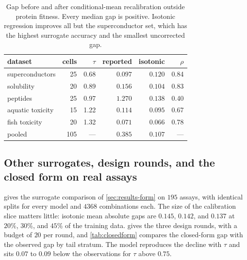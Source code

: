 \documentclass{article}
\theoremstyle{plain}
\theoremstyle{definition}
\begin{document}
\begin{table}[ht]
\caption{Gap before and after conditional-mean recalibration outside protein fitness.
Every median gap is positive. Isotonic regression improves all but the superconductor
set, which has the highest surrogate accuracy and the smallest uncorrected gap.}
\label{tab:domains}
\vskip 0.1in
\begin{center}
\begin{small}
\begin{tabular}{lrrrrr}
\toprule
dataset & cells & $\tau$ & reported & isotonic & $\rho$ \\
\midrule
superconductors & 25 & 0.68 & $0.097$ & $0.120$ & 0.84 \\
solubility      & 20 & 0.89 & $0.156$ & $0.104$ & 0.83 \\
peptides        & 25 & 0.97 & $1.270$ & $0.138$ & 0.40 \\
aquatic toxicity & 15 & 1.22 & $0.114$ & $0.095$ & 0.67 \\
fish toxicity   & 20 & 1.32 & $0.071$ & $0.066$ & 0.78 \\
\midrule
pooled          & 105 & --- & $0.385$ & $0.107$ & --- \\
\bottomrule
\end{tabular}
\end{small}
\end{center}
\vskip -0.1in
\end{table}

\subsection{Other surrogates, design rounds, and the closed form on real assays}
\label{app:form}

 gives the surrogate comparison of \cref{sec:results-form} on
$195$ assays, with identical splits for every model and $4368$ combinations each. The
size of the calibration slice matters little: isotonic mean absolute gaps are $0.145$,
$0.142$, and $0.137$ at $20\%$, $30\%$, and $45\%$ of the training data.
 gives the three design rounds, with a budget of $20$ per round, and
\cref{tab:closedform} compares the closed-form gap with the observed gap by tail
stratum. The model reproduces the decline with $\tau$ and sits $0.07$ to $0.09$ below
the observations for $\tau$ above $0.75$.
\end{document}
